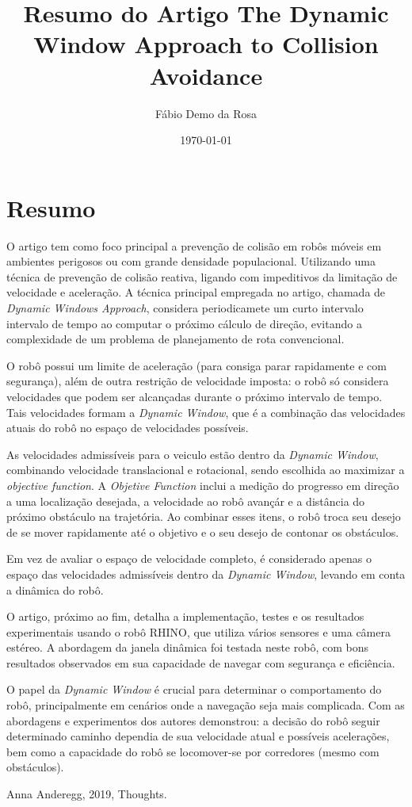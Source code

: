 \documentclass[12pt, a4paper]{article}
\begin{document}
\title{Resumo do Artigo The Dynamic Window Approach to Collision Avoidance}
\author{Fábio Demo da Rosa}
\date{\today}

\maketitle

\section{Resumo}
	O artigo tem como foco principal a prevenção de colisão em robôs móveis em ambientes perigosos ou com grande densidade populacional. Utilizando uma técnica de prevenção de colisão reativa, ligando com impeditivos da limitação de velocidade e aceleração.
	A técnica principal empregada no artigo, chamada de \textit{Dynamic Windows Approach}, considera periodicamete um curto intervalo intervalo de tempo ao computar o próximo cálculo de direção, evitando a complexidade de um problema de planejamento de rota convencional.

	O robô possui um limite de aceleração (para consiga parar rapidamente e com segurança), além de outra restrição de velocidade imposta: o robô só considera velocidades que podem ser alcançadas durante o próximo intervalo de tempo. 
	Tais velocidades formam a \textit{Dynamic Window}, que é a combinação das velocidades atuais do robô no espaço de velocidades possíveis.

	As velocidades admissíveis para o veiculo estão dentro da \textit{Dynamic Window}, combinando velocidade translacional e rotacional, sendo escolhida ao maximizar a \textit{objective function}. A \textit{Objetive Function} inclui a medição do progresso em direção a uma localização desejada, a velocidade ao robô avançár e a distância do próximo obstáculo na trajetória.
	Ao combinar esses itens, o robô troca seu desejo de se mover rapidamente até o objetivo e o seu desejo de contonar os obstáculos.

	Em vez de avaliar o espaço de velocidade completo, é considerado apenas o espaço das velocidades admissíveis dentro da \textit{Dynamic Window}, levando em conta a dinâmica do robô. 

	O artigo, próximo ao fim, detalha a implementação, testes e os resultados experimentais usando o robô RHINO, que utiliza vários sensores e uma câmera estéreo. A abordagem da janela dinâmica foi testada neste robô, com bons resultados observados em sua capacidade de navegar com segurança e eficiência.

	O papel da \textit{Dynamic Window} é crucial para determinar o comportamento do robô, principalmente em cenários onde a navegação seja mais complicada. Com as abordagens e experimentos dos autores demonstrou: a decisão do robô seguir determinado caminho dependia de sua velocidade atual e possíveis acelerações, bem como a capacidade do robô se locomover-se por corredores (mesmo com obstáculos).

	\begin{thebibliography}{2}

		 Anna Anderegg, 2019, Thoughts.
		
		\end{thebibliography}
		
	
\end{document}
